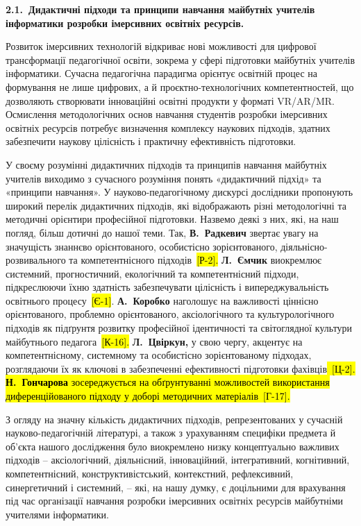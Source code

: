 \textbf{2.1.~Дидактичні підходи та принципи навчання майбутніх учителів інформатики розробки імерсивних освітніх ресурсів.}

Розвиток імерсивних технологій відкриває нові можливості для цифрової трансформації педагогічної освіти, зокрема у сфері підготовки майбутніх учителів інформатики. Сучасна педагогічна парадигма орієнтує освітній процес на формування не лише цифрових, а й проєктно-технологічних компетентностей, що дозволяють створювати інноваційні освітні продукти у форматі VR/AR/MR. Осмислення методологічних основ навчання студентів розробки імерсивних освітніх ресурсів потребує визначення комплексу наукових підходів, здатних забезпечити наукову цілісність і практичну ефективність підготовки.

У своєму розумінні дидактичних підходів та принципів навчання майбутніх учителів виходимо з сучасного розуміння понять «дидактичний підхід» та «принципи навчання». У науково-педагогічному дискурсі дослідники пропонують широкий перелік дидактичних підходів, які відображають різні методологічні та методичні орієнтири професійної підготовки. Назвемо деякі з них, які, на наш погляд, більш дотичні до нашої теми. Так, \textbf{В.~Радкевич} звертає увагу на значущість знаннєво орієнтованого, особистісно зорієнтованого, діяльнісно-розвивального та компетентнісного підходів~\hl{{[}Р-2{]}.} \textbf{Л.~Ємчик} виокремлює системний, прогностичний, екологічний та компетентнісний підходи, підкреслюючи їхню здатність забезпечувати цілісність і випереджувальність освітнього процесу~\hl{{[}Є-1{]}}. \textbf{А.~Коробко} наголошує на важливості ціннісно орієнтованого, проблемно орієнтованого, аксіологічного та культурологічного підходів як підґрунтя розвитку професійної ідентичності та світоглядної культури майбутнього педагога~\hl{{[}К-16{]}.} \textbf{Л.~Цвіркун,} у свою чергу, акцентує на компетентнісному, системному та особистісно зорієнтованому підходах, розглядаючи їх як ключові в забезпеченні ефективності підготовки фахівців\hl{~{[}Ц-2{]}. \textbf{Н.~Гончарова} зосереджується на обґрунтуванні можливостей використання диференційованого підходу у доборі методичних матеріалів~{[}Г-17{]}.}

З огляду на значну кількість дидактичних підходів, репрезентованих у сучасній науково-педагогічній літературі, а також з урахуванням специфіки предмета й об'єкта нашого дослідження було виокремлено низку концептуально важливих підходів -- аксіологічний, діяльнісний, інноваційний, інтегративний, когнітивний, компетентнісний, конструктивістський, контекстний, рефлексивний, синергетичний і системний, -- які, на нашу думку, є доцільними для врахування під час організації навчання розробки імерсивних освітніх ресурсів майбутніми учителями інформатики.

